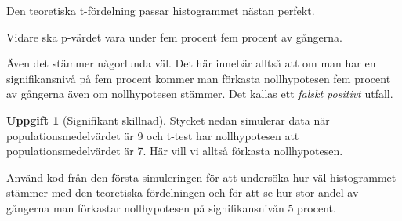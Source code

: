 \documentclass[
]{book}
\newenvironment{Shaded}{\begin{snugshade}}{\end{snugshade}}
\newcommand{\AttributeTok}[1]{\textcolor[rgb]{0.13,0.29,0.53}{#1}}
\newcommand{\ControlFlowTok}[1]{\textcolor[rgb]{0.13,0.29,0.53}{\textbf{#1}}}
\newcommand{\DecValTok}[1]{\textcolor[rgb]{0.00,0.00,0.81}{#1}}
\newcommand{\FloatTok}[1]{\textcolor[rgb]{0.00,0.00,0.81}{#1}}
\newcommand{\FunctionTok}[1]{\textcolor[rgb]{0.13,0.29,0.53}{\textbf{#1}}}
\newcommand{\NormalTok}[1]{#1}
\newcommand{\OtherTok}[1]{\textcolor[rgb]{0.56,0.35,0.01}{#1}}
\newcommand{\SpecialCharTok}[1]{\textcolor[rgb]{0.81,0.36,0.00}{\textbf{#1}}}
\theoremstyle{definition}
\theoremstyle{definition}
\theoremstyle{definition}
\newtheorem{exercise}{Uppgift}[chapter]
\theoremstyle{definition}
\theoremstyle{remark}
\begin{document}
Den teoretiska t-fördelning passar histogrammet nästan perfekt.

Vidare ska p-värdet vara under fem procent fem procent av gångerna.

\begin{Shaded}
\end{Shaded}

Även det stämmer någorlunda väl. Det här innebär alltså att om man har en signifikansnivå på fem procent kommer man förkasta nollhypotesen fem procent av gångerna även om nollhypotesen stämmer. Det kallas ett \emph{falskt positivt} utfall.

\begin{exercise}[Signifikant skillnad]
Stycket nedan simulerar data när populationsmedelvärdet är 9 och t-test har nollhypotesen att populationsmedelvärdet är 7. Här vill vi alltså förkasta nollhypotesen.

\begin{Shaded}
\end{Shaded}

Använd kod från den första simuleringen för att undersöka hur väl histogrammet stämmer med den teoretiska fördelningen och för att se hur stor andel av gångerna man förkastar nollhypotesen på signifikansnivån 5 procent.
\end{exercise}
\end{document}
